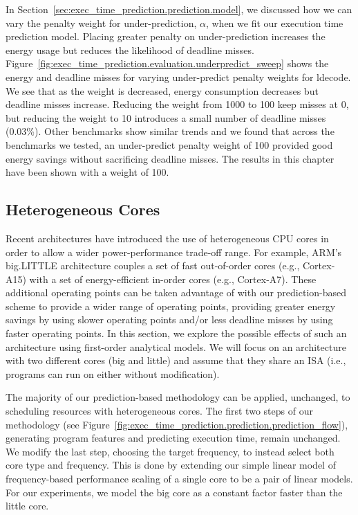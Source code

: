 In Section~\ref{sec:exec_time_prediction.prediction.model}, we discussed how we
can vary the penalty weight for under-prediction, $\alpha$, when we fit our
execution time prediction model. Placing greater penalty on under-prediction
increases the energy usage but reduces the likelihood of deadline misses.
Figure~\ref{fig:exec_time_prediction.evaluation.underpredict_sweep} shows the
energy and deadline misses for varying under-predict penalty weights for
ldecode. We see that as the weight is decreased, energy consumption decreases
but deadline misses increase. Reducing the weight from 1000 to 100 keep misses
at 0, but reducing the weight to 10 introduces a small number of deadline
misses (0.03\%). Other benchmarks show similar trends and we found that across
the benchmarks we tested, an under-predict penalty weight of 100 provided good
energy savings without sacrificing deadline misses. The results in this chapter
have been shown with a weight of 100.

\subsection{Heterogeneous Cores}

Recent architectures have introduced the use of heterogeneous CPU cores in
order to allow a wider power-performance trade-off range. For example, ARM's
big.LITTLE architecture couples a set of fast out-of-order cores (e.g.,
Cortex-A15) with a set of energy-efficient in-order cores (e.g., Cortex-A7).
These additional operating points can be taken advantage of with our
prediction-based scheme to provide a wider range of operating points, providing
greater energy savings by using slower operating points and/or less deadline
misses by using faster operating points. In this section, we explore the
possible effects of such an architecture using first-order analytical models.
We will focus on an architecture with two different cores (big and little) and
assume that they share an ISA (i.e., programs can run on either without
modification).

The majority of our prediction-based methodology can be applied, unchanged, to
scheduling resources with heterogeneous cores. The first two steps of our
methodology (see
Figure~\ref{fig:exec_time_prediction.prediction.prediction_flow}), generating
program features and predicting execution time, remain unchanged. We modify
the last step, choosing the target frequency, to instead select both core type and
frequency.  This is done by extending our simple linear model of
frequency-based performance scaling of a single core to be a pair of linear
models. For our experiments, we model the big core as a constant factor faster
than the little core.

